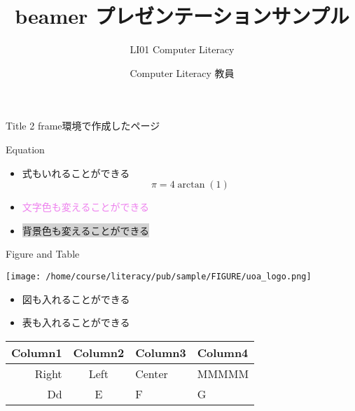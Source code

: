 \documentclass[platex,a4paper,12pt,dvipdfmx,aspectratio=169]{beamer}
\title{beamer プレゼンテーションサンプル}
\subtitle{LI01 Computer Literacy}
\author{Computer Literacy 教員}
\institute{会津大学}
\begin{document}
\frame{
\titlepage
}


\begin{frame}{Title 2}
frame環境で作成したページ
\end{frame}



\begin{frame}{Equation}
\begin{itemize}
\item  式もいれることができる
\begin{equation} \pi = 4\arctan(1) \end{equation}
\item \textcolor{violet}{文字色も変えることができる}
\item \colorbox{lightgray}{背景色も変えることができる}
\end{itemize}
\end{frame}

\begin{frame}{Figure and Table}

\texttt{[image: /home/course/literacy/pub/sample/FIGURE/uoa\_logo.png]}

\begin{itemize}
\item  図も入れることができる
\item  表も入れることができる
\end{itemize}

\begin{tabular}{rclp{5em}}
  \hline
  Column1    & Column2 & Column3 & Column4\\
  \hline
   Right    & Left & Center &  MMMMM\\
  Dd     & E & F & G\\
  \hline
\end{tabular}


\end{frame}
\end{document}
